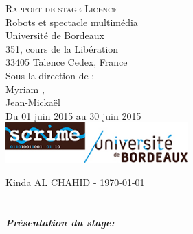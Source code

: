 \documentclass[10pt,a4paper]{report}
\begin{document}
\begin{titlepage} 
\begin{center}

        \textsc{\Huge Rapport de stage Licence}\\[1cm]
        {\huge Robots et spectacle multimédia}\\[1cm]
        {\Large Université de Bordeaux \\ 
351, cours de la Libération\\ 33405 Talence Cedex, France}\\[1cm]
        {\Large Sous la direction de : \\}
        {\Large Myriam ,\\
         Jean-Mickaël }\\[1cm]
         {\Large Du 01 juin 2015 au 30 juin 2015\\}
    		\includegraphics[width=7cm]{image/scrime.jpg} 	
 
\end{center}

    \begin{flushbottom}
        \begin{flushleft}
            \large Kinda \textsc{AL CHAHID} - \today \\
        \end{flushleft}
    \end{flushbottom}

\end{titlepage}




\tableofcontents
{}

\printglossary[type=\acronymtype]


\chapter*{}
\paragraph{Présentation du stage:}
\end{document}
